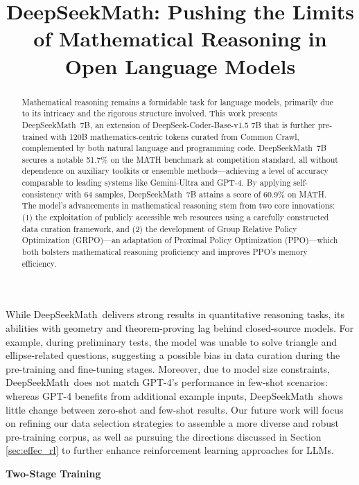 \title{DeepSeekMath: Pushing the Limits of Mathematical Reasoning in Open Language Models}

\begin{abstract}
Mathematical reasoning remains a formidable task for language models, primarily due to its intricacy and the rigorous structure involved. This work presents DeepSeekMath~7B, an extension of DeepSeek-Coder-Base-v1.5 7B that is further pre-trained with 120B mathematics-centric tokens curated from Common Crawl, complemented by both natural language and programming code. DeepSeekMath~7B secures a notable 51.7\% on the MATH benchmark at competition standard, all without dependence on auxiliary toolkits or ensemble methods—achieving a level of accuracy comparable to leading systems like Gemini-Ultra and GPT-4. By applying self-consistency with 64 samples, DeepSeekMath~7B attains a score of 60.9\% on MATH. The model’s advancements in mathematical reasoning stem from two core innovations: (1) the exploitation of publicly accessible web resources using a carefully constructed data curation framework, and (2) the development of Group Relative Policy Optimization (GRPO)—an adaptation of Proximal Policy Optimization (PPO)—which both bolsters mathematical reasoning proficiency and improves PPO’s memory efficiency.
\end{abstract}

While DeepSeekMath~delivers strong results in quantitative reasoning tasks, its abilities with geometry and theorem-proving lag behind closed-source models. For example, during preliminary tests, the model was unable to solve triangle and ellipse-related questions, suggesting a possible bias in data curation during the pre-training and fine-tuning stages. Moreover, due to model size constraints, DeepSeekMath~does not match GPT-4’s performance in few-shot scenarios: whereas GPT-4 benefits from additional example inputs, DeepSeekMath~shows little change between zero-shot and few-shot results. Our future work will focus on refining our data selection strategies to assemble a more diverse and robust pre-training corpus, as well as pursuing the directions discussed in Section \ref{sec:effec_rl} to further enhance reinforcement learning approaches for LLMs.

\textbf{Two-Stage Training}

